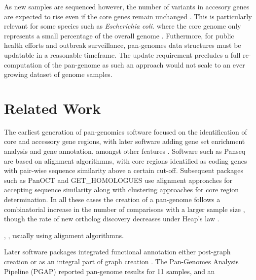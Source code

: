 \documentclass{article}
\begin{document}

As new samples are sequenced however, the number of variants in accesory genes are expected to rise even if the core genes remain unchanged \cite{medini2005microbial}.
This is particularly relevant for some species such as \textit{Escherichia coli.} where the core genome only represents a small percentage of the overall genome \cite{fukiya2004extensive}.
Futhermore, for public health efforts and outbreak surveillance, pan-genomes data structures must be updatable in a reasonable timeframe.
The update requirement precludes a full re-computation of the pan-genome as such an approach would not scale to an ever growing dataset of genome samples.


\enlargethispage{-65.1pt}

\section{Related Work}

The earliest generation of pan-genomics software focused on the identification of core and accessory gene regions, with later software adding gene set enrichment analysis and gene annotation, amongst other features \cite{xiao2015brief}.
Software such as Panseq \cite{laing2010pan} are based on alignment algorithmns, with core regions identified as coding genes with pair-wise sequence similarity above a certain cut-off.
Subsequent packages such as PanOCT \cite{fouts2012panoct} and GET_HOMOLOGUES \cite{contreras2013get_homologues} use alignment approaches for accepting sequence similarity along with clustering approaches for core region determination.
In all these cases the creation of a pan-genome follows a combinatorial increase in the number of comparisons with a larger sample size \cite{vernikos2015ten}, though the rate of new ortholog discovery decreases under Heap's law \cite{tettelin2008comparative}.

,  , usually using alignment algorithmns.

Later software packages integrated functional annotation either post-graph creation \cite{zhao2011pgap} or as an integral part of graph creation \cite{page2015roary}.
The Pan-Genomes Analysis Pipeline (PGAP) \cite{zhao2011pgap} reported pan-genome results for 11 samples, and an 
\end{document}
